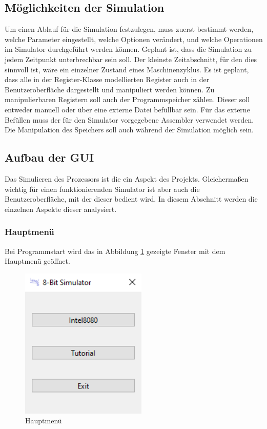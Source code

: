 \documentclass[12pt]{article}
\newcommand{\imgSpaceBefore}{\vspace{10pt}}
\begin{document}
\subsection{Möglichkeiten der Simulation}
Um einen Ablauf für die Simulation festzulegen, muss zuerst bestimmt werden, welche Parameter eingestellt, welche Optionen verändert, und welche Operationen im Simulator durchgeführt werden können. Geplant ist, dass die Simulation zu jedem Zeitpunkt unterbrechbar sein soll. Der kleinste Zeitabschnitt, für den dies sinnvoll ist, wäre ein einzelner Zustand eines Maschinenzyklus. Es ist geplant, dass alle in der Register-Klasse modellierten Register auch in der Benutzeroberfläche dargestellt und manipuliert werden können. Zu manipulierbaren Registern soll auch der Programmspeicher zählen. Dieser soll entweder manuell oder über eine externe Datei befüllbar sein. Für das externe Befüllen muss der für den Simulator vorgegebene Assembler \cite{Assembler} verwendet werden. Die Manipulation des Speichers soll auch während der Simulation möglich sein.

\subsection{Aufbau der GUI}
\label{chp:AufbauGUI}
Das Simulieren des Prozessors ist die ein Aspekt des Projekts. Gleichermaßen wichtig für einen funktionierenden Simulator ist aber auch die Benutzeroberfläche, mit der dieser bedient wird. In diesem Abschnitt werden die einzelnen Aspekte dieser analysiert.
\subsubsection{Hauptmenü}
Bei Programmstart wird das in Abbildung \ref{fig:Hauptmenue} gezeigte Fenster mit dem Hauptmenü geöffnet.\imgSpaceBefore

\begin{figure}[H]
\centering
\includegraphics[width=6cm]{bilder/Hauptmenue}
\caption{Hauptmenü}
\label{fig:Hauptmenue}
\end{figure}
\end{document}
